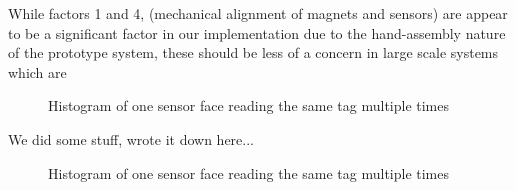 While factors 1 and 4, (mechanical alignment of magnets and sensors) are appear to be a significant factor in our implementation due to the hand-assembly nature of the prototype system, these should be less of a concern in large scale systems which are 

\begin{figure}[h]
	
	\caption{Histogram of one sensor face reading the same tag multiple times}
	\label{fig:histogram}
\end{figure}

We did some stuff, wrote it down here...

\begin{figure}[h]
	
	\caption{Histogram of one sensor face reading the same tag multiple times}
	\label{fig:histogram}
\end{figure}
















